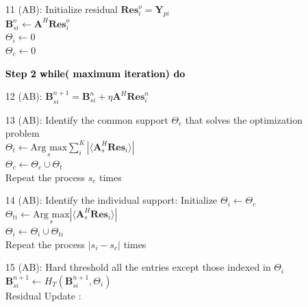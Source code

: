 \begin{center}
{\begin{minipage}{1.2\linewidth}
\begin{algorithm}[H]
\begin{enumerate}
\item [11 (AB):]  Initialize residual $\mathbf{Res}_i^o=\mathbf{Y}_{pi}$ \\
$\mathbf{B}_{si}^o \leftarrow \mathbf{A}^H  \mathbf{Res}_i^o$\\
 $\Theta_i\leftarrow 0$ \\
$\Theta_c \leftarrow  0$\\
\rule{0pt}{4ex}    
\textbf{\textcolor{black}{Step 2 while( maximum iteration) do}}
\hspace*{\algorithmicindent} 
\item [12 (AB):]\hspace*{\algorithmicindent} $\mathbf{B}_{si}^{n+1}=\mathbf{B}_{si}^n+ \eta \mathbf{A}^H \mathbf{Res}_i^n $
 \hspace*{\algorithmicindent} 
\item [13 (AB):] Identify the common support $\Theta_c $ that solves the optimization problem \\\hspace*{\algorithmicindent} 
     $\Theta_t\leftarrow\underset{s}{\text{Arg max}} \sum_i^K |\langle \mathbf{A}_s^H \mathbf{Res}_i \rangle|$\\ \hspace*{\algorithmicindent}
      $\Theta_c \leftarrow \Theta_c \cup \Theta_t $\\
      Repeat the process $s_c$ times
\item [14 (AB):] Identify the individual support: Initialize $\Theta_i \leftarrow \Theta_c $\\
\hspace*{\algorithmicindent} $\Theta_{ti}\leftarrow\underset{s}{\text{Arg max}}  |\langle \mathbf{A}_s^H \mathbf{Res}_i \rangle|$\\ 
\hspace*{\algorithmicindent}
  $\Theta_i\leftarrow \Theta_i \cup \Theta_{ti} $\\
  Repeat the process $|s_i-s_c|$ times
\item [15 (AB):] Hard threshold all the entries  except those indexed in $\Theta_i$\\
\hspace*{\algorithmicindent} $\mathrel{\mathbf{B}_{si}^{n+1}}\leftarrow H_T(\mathbf{B}_{si}^{n+1},\Theta_i)$\\
 Residual Update : 

\end{enumerate}
\end{algorithm}
\end{minipage}}
\end{center}

